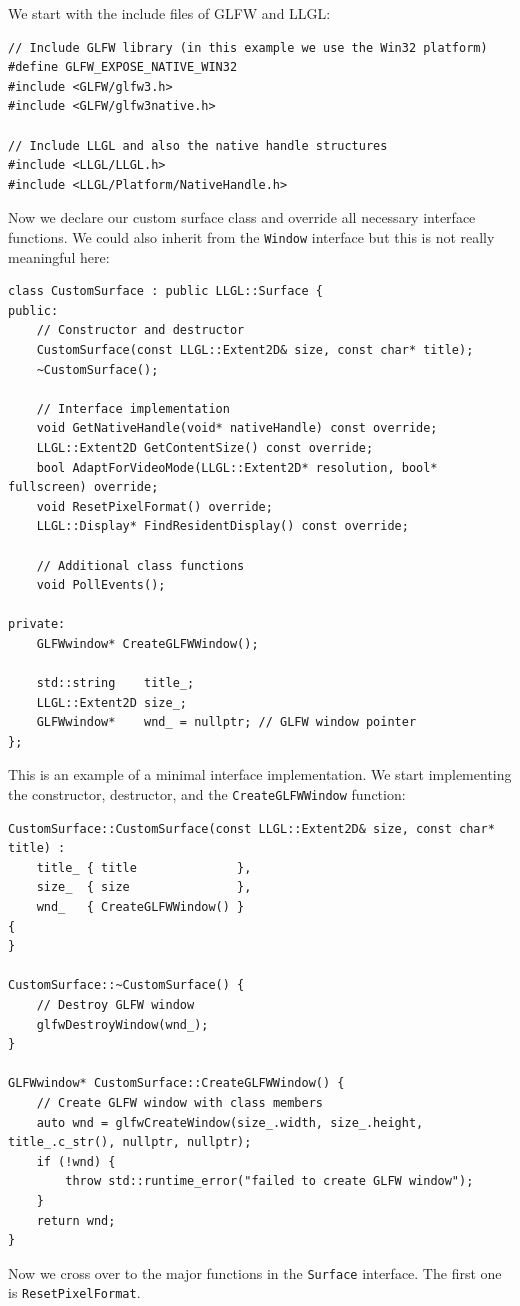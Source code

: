 \documentclass{article}
\begin{document}
We start with the include files of GLFW and LLGL:
\begin{lstlisting}
// Include GLFW library (in this example we use the Win32 platform)
#define GLFW_EXPOSE_NATIVE_WIN32
#include <GLFW/glfw3.h>
#include <GLFW/glfw3native.h>

// Include LLGL and also the native handle structures
#include <LLGL/LLGL.h>
#include <LLGL/Platform/NativeHandle.h>
\end{lstlisting}
Now we declare our custom surface class and override all necessary interface functions.
We could also inherit from the \texttt{Window} interface but this is not really meaningful here:
\begin{lstlisting}
class CustomSurface : public LLGL::Surface {
public:
	// Constructor and destructor
	CustomSurface(const LLGL::Extent2D& size, const char* title);
	~CustomSurface();

	// Interface implementation
	void GetNativeHandle(void* nativeHandle) const override;
	LLGL::Extent2D GetContentSize() const override;
	bool AdaptForVideoMode(LLGL::Extent2D* resolution, bool* fullscreen) override;
	void ResetPixelFormat() override;
	LLGL::Display* FindResidentDisplay() const override;

	// Additional class functions
	void PollEvents();

private:
	GLFWwindow* CreateGLFWWindow();

	std::string    title_;
	LLGL::Extent2D size_;
	GLFWwindow*    wnd_ = nullptr; // GLFW window pointer
};
\end{lstlisting}
This is an example of a minimal interface implementation.
We start implementing the constructor, destructor, and the \texttt{CreateGLFWWindow} function:
\begin{lstlisting}
CustomSurface::CustomSurface(const LLGL::Extent2D& size, const char* title) :
	title_ { title              },
	size_  { size               },
	wnd_   { CreateGLFWWindow() }
{
}

CustomSurface::~CustomSurface() {
	// Destroy GLFW window
	glfwDestroyWindow(wnd_);
}

GLFWwindow* CustomSurface::CreateGLFWWindow() {
	// Create GLFW window with class members
	auto wnd = glfwCreateWindow(size_.width, size_.height, title_.c_str(), nullptr, nullptr);
	if (!wnd) {
		throw std::runtime_error("failed to create GLFW window");
	}
	return wnd;
}
\end{lstlisting}
Now we cross over to the major functions in the \texttt{Surface} interface. The first one is \texttt{ResetPixelFormat}.
\end{document}
